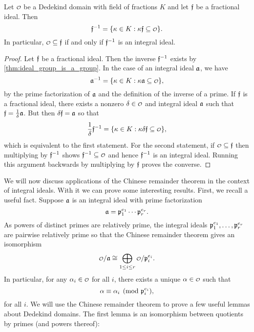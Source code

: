     \begin{proposition}\label{prop:explicit_inverse_ideal}
      Let $\smc{O}$ be a Dedekind domain with field of fractions $K$ and let $\mathfrak{f}$ be a fractional ideal. Then
      \[
        \mf{f}^{-1} = \{\k \in K:\k\mf{f} \subseteq \smc{O}\}.
      \]
      In particular, $\smc{O} \subseteq \mf{f}$ if and only if $\mathfrak{f}^{-1}$ is an integral ideal.
    \end{proposition}
    \begin{proof}
      Let $\mathfrak{f}$ be a fractional ideal. Then the inverse $\mathfrak{f}^{-1}$ exists by \cref{thm:ideal_group_is_a_group}. In the case of an integral ideal $\mathfrak{a}$, we have
      \[
        \mf{a}^{-1} = \{\k \in K:\k\mf{a} \subseteq \smc{O}\},
      \]
      by the prime factorization of $\mathfrak{a}$ and the definition of the inverse of a prime. If $\mathfrak{f}$ is a fractional ideal, there exists a nonzero $\d \in \smc{O}$ and integral ideal $\mathfrak{a}$ such that $\mathfrak{f} = \frac{1}{\delta}\mathfrak{a}$. But then $\delta\mathfrak{f} = \mathfrak{a}$ so that
      \[
        \frac{1}{\d}\mf{f}^{-1} = \{\k \in K:\k\d\mf{f} \subseteq \smc{O}\},
      \]
      which is equivalent to the first statement. For the second statement, if $\smc{O} \subseteq \mf{f}$ then multiplying by $\mathfrak{f}^{-1}$ shows $\mf{f}^{-1} \subseteq \smc{O}$ and hence $\mathfrak{f}^{-1}$ is an integral ideal. Running this argument backwards by multiplying by $\mathfrak{f}$ proves the converse.
    \end{proof}

    We will now discuss applications of the Chinese remainder theorem in the context of integral ideals. With it we can prove some interesting results. First, we recall a useful fact. Suppose $\mathfrak{a}$ is an integral ideal with prime factorization
    \[
      \mathfrak{a} = \mathfrak{p}_{1}^{e_{1}} \cdots \mathfrak{p}_{r}^{e_{r}}.
    \]
    As powers of distinct primes are relatively prime, the integral ideals $\mathfrak{p}_{1}^{e_{1}},\ldots,\mathfrak{p}_{r}^{e_{r}}$ are pairwise relatively prime so that the Chinese remainder theorem gives an isomorphism
    \[
      \smc{O}/\mf{a} \cong \bigop_{1 \le i \le r}\smc{O}/\mf{p}_{i}^{e_{i}}.
    \]
    In particular, for any $\a_{i} \in \smc{O}$ for all $i$, there exists a unique $\a \in \smc{O}$ such that
    \[
      \alpha \equiv \alpha_{i} \pmod{\mathfrak{p}_{i}^{e_{i}}},
    \]
    for all $i$. We will use the Chinese remainder theorem to prove a few useful lemmas about Dedekind domains. The first lemma is an isomorphism between quotients by primes (and powers thereof):

